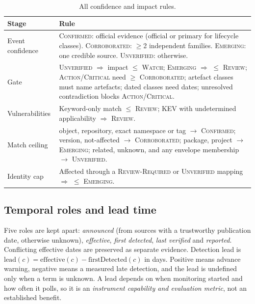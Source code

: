 \documentclass[11pt,a4paper]{article}
\begin{document}
\begin{table}[t]
\centering
\small
\begin{tabularx}{\linewidth}{@{}l X@{}}
\toprule
Stage & Rule \\
\midrule
Event confidence & \textsc{Confirmed}: official evidence (official or primary
  for lifecycle classes). \textsc{Corroborated}: $\ge$2 independent families.
  \textsc{Emerging}: one credible source. \textsc{Unverified}: otherwise. \\
Gate & \textsc{Unverified} $\Rightarrow$ impact $\le$ \textsc{Watch};
  \textsc{Emerging} $\Rightarrow$ $\le$ \textsc{Review};
  \textsc{Action}/\textsc{Critical} need $\ge$ \textsc{Corroborated};
  artefact classes must name artefacts; dated classes need dates;
  unresolved contradiction blocks \textsc{Action}/\textsc{Critical}. \\
Vulnerabilities & Keyword-only match $\le$ \textsc{Review}; KEV with
  undetermined applicability $\Rightarrow$ \textsc{Review}. \\
Match ceiling & object, repository, exact namespace or tag
  $\to$ \textsc{Confirmed}; version, not-affected $\to$
  \textsc{Corroborated}; package, project $\to$
  \textsc{Emerging}; related, unknown, and any envelope membership
  $\to$ \textsc{Unverified}. \\
Identity cap & Affected through a \textsc{Review-Required} or
  \textsc{Unverified} mapping $\Rightarrow$ $\le$ \textsc{Emerging}. \\
\bottomrule
\end{tabularx}
\caption{All confidence and impact rules.}
\label{tab:caps}
\end{table}

\subsection{Temporal roles and lead time}
\label{sec:temporal}
Five roles are kept apart: \emph{announced} (from sources with a
trustworthy publication date, otherwise unknown), \emph{effective},
\emph{first detected}, \emph{last verified} and \emph{reported}.
Conflicting effective dates are preserved as separate evidence.
Detection lead is
$\mathrm{lead}(c) = \mathrm{effective}(c) - \mathrm{firstDetected}(c)$
in days. Positive means advance warning, negative means a measured late
detection, and the lead is undefined only when a term is unknown. A lead
depends on when monitoring started and how often it polls, so it is an
\emph{instrument capability and evaluation metric}, not an established
benefit.
\end{document}
